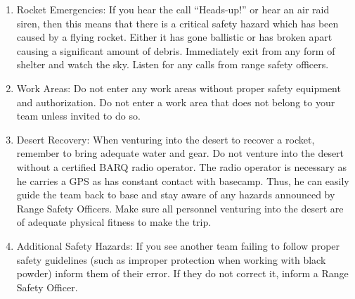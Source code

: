 \begin{enumerate}
\begin{enumerate}
            \item Rocket Emergencies: If you hear the call “Heads-up!” or hear an air raid siren, then this means that there is a critical safety hazard which has been caused by a flying rocket. Either it has gone ballistic or has broken apart causing a significant amount of debris. Immediately exit from any form of shelter and watch the sky. Listen for any calls from range safety officers.
            \item Work Areas: Do not enter any work areas without proper safety equipment and authorization. Do not enter a work area that does not belong to your team unless invited to do so.
            \item Desert Recovery: When venturing into the desert to recover a rocket, remember to bring adequate water and gear. Do not venture into the desert without a certified BARQ radio operator. The radio operator is necessary as he carries a GPS as has constant contact with basecamp. Thus, he can easily guide the team back to base and stay aware of any hazards announced by Range Safety Officers. Make sure all personnel venturing into the desert are of adequate physical fitness to make the trip.
            \item Additional Safety Hazards: If you see another team failing to follow proper safety guidelines (such as improper protection when working with black powder) inform them of their error. If they do not correct it, inform a Range Safety Officer.
        \end{enumerate}
    \end{enumerate}
